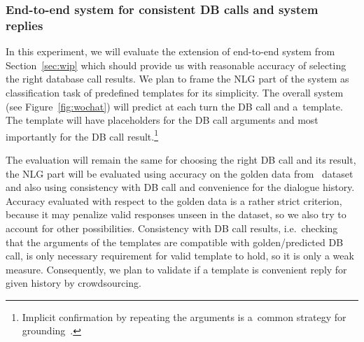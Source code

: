 \documentclass[11pt]{article}
\begin{document}
\subsubsection*{End-to-end system for consistent DB calls and system replies}
In this experiment, we will evaluate the extension of end-to-end system from Section~\ref{sec:wip} which should provide us with reasonable accuracy of selecting the right database call results.
We plan to frame the NLG part of the system as classification task of predefined templates for its simplicity.
The overall system (see Figure~\ref{fig:wochat}) will predict at each turn the DB call and a~template.
The template will have placeholders for the DB call arguments and most importantly for the DB call result.\footnote{Implicit confirmation by repeating the arguments is a~common strategy for grounding~\cite{meena_crowdsourcing_2014}.}

The evaluation will remain the same for choosing the right DB call and its result, the NLG part will be evaluated using accuracy on the golden data from~\cite{platek2016wochat} dataset and also using consistency with DB call and convenience for the dialogue history.
Accuracy evaluated with respect to the golden data is a rather strict criterion, because it may penalize valid responses unseen in the dataset, so we also try to account for other possibilities.
Consistency with DB call results, i.e.\ checking that the arguments of the templates are compatible with golden/predicted DB call, is only necessary requirement for valid template to hold, so it is only a weak measure.
Consequently, we plan to validate if a template is convenient reply for given history by crowdsourcing.
\end{document}
